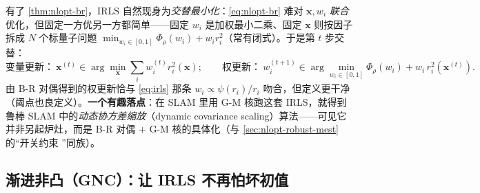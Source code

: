 有了 \cref{thm:nlopt-br}，IRLS 自然现身为\emph{交替最小化}：\cref{eq:nlopt-br} 难对 $\mathbf{x},w_i$ \emph{联合}优化，但固定一方优另一方都简单——固定 $w_i$ 是加权最小二乘、固定 $\mathbf{x}$ 则按因子拆成 $N$ 个标量子问题 $\min_{w_i\in[0,1]}\Phi_\rho(w_i)+w_ir_i^2$（常有闭式）。于是第 $t$ 步交替：
\begin{equation}
  \textbf{变量更新：}\ \mathbf{x}^{(t)}\in\arg\min_{\mathbf{x}}\sum_i w_i^{(t)}r_i^2(\mathbf{x});
  \qquad
  \textbf{权更新：}\ w_i^{(t+1)}\in\arg\min_{w_i\in[0,1]}\Phi_\rho(w_i)+w_i\,r_i^2(\mathbf{x}^{(t)}).
  \label{eq:nlopt-br-altmin}
\end{equation}
由 B-R 对偶得到的权更新恰与 \cref{eq:irls} 那条 $w_i\propto\psi(r_i)/r_i$ 吻合，但定义更干净（阈点也良定义）。\textbf{一个有趣落点}：在 SLAM 里用 G-M 核跑这套 IRLS，就得到鲁棒 SLAM 中的\emph{动态协方差缩放}（dynamic covariance scaling）算法——可见它并非另起炉灶，而是 B-R 对偶 $+$ G-M 核的具体化（与 \cref{sec:nlopt-robust-mest} 的“开关约束 \cite{sunderhauf2012switchable}”同族）。

\subsection{渐进非凸（GNC）：让 IRLS 不再怕坏初值}
\label{sec:nlopt-robust-gnc}

